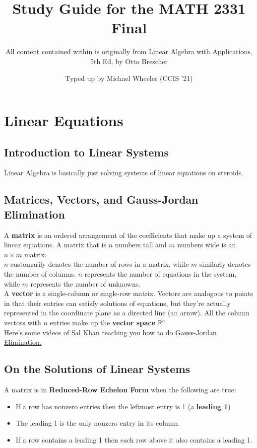 \documentclass[]{scrartcl}
\title{Study Guide for the MATH 2331 Final}
\subtitle{All content contained within is originally from Linear Algebra with Applications, 5th Ed. by Otto Brescher}
\author{Typed up by Michael Wheeler (CCIS '21)}
\begin{document}
	\maketitle
	
	\setcounter{section}{0}
	\section{Linear Equations}
	\subsection{Introduction to Linear Systems}
	Linear Algebra is basically just solving systems of linear equations on steroids.
	
	\subsection{Matrices, Vectors, and Gauss-Jordan Elimination}
	A \textbf{matrix} is an ordered arrangement of the coefficients that make up a system of linear equations. A matrix that is $n$ numbers tall and $m$ numbers wide is an $n \times m$ matrix.\\
	
	$n$ customarily denotes the number of rows in a matrix, while $m$ similarly denotes the number of columns. $n$ represents the number of equations in the system, while $m$ represents the number of unknowns.\\
	
	A \textbf{vector} is a single-column or single-row matrix. Vectors are analogous to points in that their entries can satisfy solutions of equations, but they're actually represented in the coordinate plane as a directed line (an arrow). All the column vectors with $n$ entries make up the \textbf{vector space} $\mathbb{R}^n$\\
	
	\href{https://www.khanacademy.org/math/precalculus/precalc-matrices}{Here's some videos of Sal Khan teaching you how to do Gauss-Jordan Elimination.}
	
	\subsection{On the Solutions of Linear Systems}
	A matrix is in \textbf{Reduced-Row Echelon Form} when the following are true:
	\begin{itemize}
		\item If a row has nonzero entries then the leftmost entry is 1 (a \textbf{leading 1})
		\item The leading 1 is the only nonzero entry in its column.
		\item If a row contains a leading 1 then each row above it also contains a leading 1.
	\end{itemize}
\end{document}
